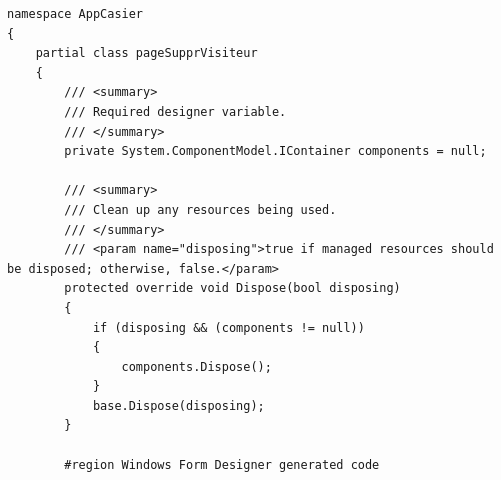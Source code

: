 \documentclass[main.tex]{subfiles}
\begin{document}
\begin{lstlisting}
namespace AppCasier
{
    partial class pageSupprVisiteur
    {
        /// <summary>
        /// Required designer variable.
        /// </summary>
        private System.ComponentModel.IContainer components = null;

        /// <summary>
        /// Clean up any resources being used.
        /// </summary>
        /// <param name="disposing">true if managed resources should be disposed; otherwise, false.</param>
        protected override void Dispose(bool disposing)
        {
            if (disposing && (components != null))
            {
                components.Dispose();
            }
            base.Dispose(disposing);
        }

        #region Windows Form Designer generated code


\end{lstlisting}
\end{document}
